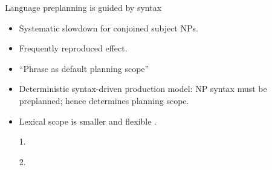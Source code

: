 
\begin{frame}{Language preplanning is guided by syntax}

	\begin{itemize}
		\item Systematic slowdown for conjoined subject NPs.
		\item Frequently reproduced effect.
		\item ``Phrase as default planning scope'' \parencite{martin2010planning}
		\item Deterministic syntax-driven production model: NP syntax must be preplanned; hence determines planning scope. 
		\item Lexical scope is smaller \parencite{gri01} and flexible \parencite{wheeldon2013}.
	\end{itemize}
	\vfill
	\begin{itemize}
		\item[1.] 
		\item[2.] 
	\end{itemize}


\end{frame}






\begin{comment}
\begin{frame}{Advance planning involves syntax}
\begin{itemize}
	\item Subordination vs coordination with conflicting results \parencite{not07, all07}.
	\begin{itemize}
		\item[2a.] The A with the B is \dots
		\item[2b.] The A and the B are \dots
	\end{itemize}		
	\item Syntactic proximity \parencite{lee13}.
	\begin{itemize}
		\item[3a.] Click on [[the fork of the king] below the apple]
		\item[3b.] Click on [the fork of [the king below the apple]]
	\end{itemize}
	\item Lexical scope is flexible \parencite{wheeldon2013}.
\end{itemize}
\end{frame}
\end{comment}


